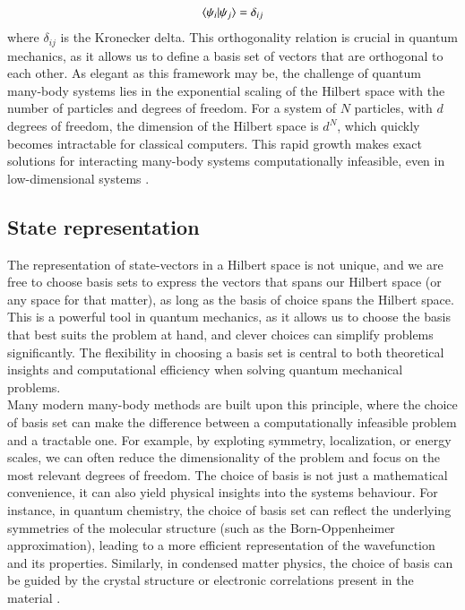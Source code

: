 \documentclass{subfiles}
\begin{document}
\begin{align*}
    \braket{\psi_i|\psi_j} = \delta_{ij}
\end{align*}
where $\delta_{ij}$ is the Kronecker delta. This orthogonality relation is crucial in quantum mechanics, as it allows us to define a basis set of vectors that are orthogonal to each other. As elegant as this framework may be, the challenge of quantum many-body systems lies in the exponential scaling of the Hilbert space with the number of particles and degrees of freedom. For a system of $N$ particles, with $d$ degrees of freedom, the dimension of the Hilbert space is $d^N$, which quickly becomes intractable for classical computers. This rapid growth makes exact solutions for interacting many-body systems computationally infeasible, even in low-dimensional systems \cite{helgaker2013molecular, szabo1996modern}.

\subsection{State representation}\label{sec:state_representation}
The representation of state-vectors in a Hilbert space is not unique, and we are free to choose basis sets to express the vectors that spans our Hilbert space (or any space for that matter), as long as the basis of choice spans the Hilbert space\cite{griffiths2018introduction, berera2021quantum}. This is a powerful tool in quantum mechanics, as it allows us to choose the basis that best suits the problem at hand, and clever choices can simplify problems significantly. The flexibility in choosing a basis set is central to both theoretical insights and computational efficiency when solving quantum mechanical problems.\cite{helgaker2013molecular, szabo1996modern} \\

Many modern many-body methods are built upon this principle, where the choice of basis set can make the difference between a computationally infeasible problem and a tractable one. For example, by exploting symmetry, localization, or energy scales, we can often reduce the dimensionality of the problem and focus on the most relevant degrees of freedom. The choice of basis is not just a mathematical convenience, it can also yield physical insights into the systems behaviour. For instance, in quantum chemistry, the choice of basis set can reflect the underlying symmetries of the molecular structure (such as the Born-Oppenheimer approximation)\cite{szabo1996modern}, leading to a more efficient representation of the wavefunction and its properties. Similarly, in condensed matter physics, the choice of basis can be guided by the crystal structure or electronic correlations present in the material \cite{baroni2001phonons, kittel2018introduction}. \\
\end{document}
